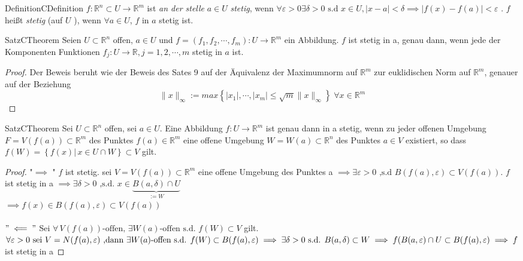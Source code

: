 \documentclass[11.5 pt, a4paper]{memoir}
\begin{document}
\begin{ibox}[]{Definition}{CDefinition}
    $ f: \mathbb{R}^n  \subset U \to \mathbb{R}^m $ ist \textit{an der stelle} $ a \in  U $ \textit{stetig}, wenn $ \forall \varepsilon 
	>0 \exists \delta >0 \text{ s.d } x \in  U, \left| x-a \right| < \delta \implies \left| f(x)-f(a) \right| < \varepsilon $ . $ f $ heißt
	\textit{stetig} (auf $ U $ ), wenn $ \forall  a \in U $, $ f \text{ in } a $ stetig ist. 
\end{ibox}

\begin{ibox}[14]{Satz}{CTheorem}
    Seien $ U \subset \mathbb{R}^n  $ offen, $ a \in  U $ und $ f=(f_1,f_2,\cdots, f_m): U \to \mathbb{R}^m  $ ein Abbildung. $ f $ ist 
	stetig in a, genau dann, wenn jede der Komponenten Funktionen $ f_{j} :U \to \mathbb{R} , j = 1,2, \cdots, m $ stetig in $ a $ ist.
\end{ibox}

\begin{proof}
	Der Beweis beruht wie der Beweis des Sates 9 auf der Äquivalenz der Maximumnorm auf $ \mathbb{R}^m $ zur euklidischen Norm auf 
	$ \mathbb{R}^m $, genauer auf der Beziehung
	$$ \|x \|_{\infty}:= max \left\{ \left| x_1 \right| ,\cdots, \left| x_m \right| \leq \sqrt{m} \|x \|_{\infty} \right\} \;  
	\forall  x \in  \mathbb{R}^m$$
	
\end{proof}
\begin{ibox}[15]{Satz}{CTheorem}
    Sei $ U \subset  \mathbb{R}^n  $ offen, sei $ a \in  U $. Eine Abbildung $ f: U \to \mathbb{R}^m $ ist genau dann in a stetig,
	wenn zu jeder offenen Umgebung $ F=V(f(a)) \subset \mathbb{R}^m $ des Punktes $ f(a) \in \mathbb{R}^m $ eine offene Umgebung
	$ W = W(a) \subset  \mathbb{R}^n  $ des Punktes $ a \in  V$ existiert, so dass $ f(W) = \left\{ f(x) |\, x \in U \cap W \right\} 
	\subset  V$ gilt. 
\end{ibox}

\begin{proof}
	"$  \implies$ " $ f $ ist stetig. sei $ V = V \left( f \left( a \right)  \right)  \subset  \mathbb{R}^m $ 
	eine offene Umgebung des Punktes a  $ \implies \exists 
	\varepsilon  >0 \text{ ,s.d } B(f(a), \varepsilon ) \subset  V(f(a))$. $ f $ ist stetig in a $ \implies \exists \delta > 0 
	\text{ ,s.d. } x \in  \underbrace{B(a, \delta) \cap U}_{:=W} $ \\ $\implies f(x) \in B(f(a), \varepsilon ) \subset  V(f(a))$\\ \\
	$ "\impliedby" $ Sei $ \forall \, V(f(a)) \text{-offen, } \exists W(a) \text{-offen s.d. } f(W) \subset  V $ gilt.
	$ \forall \varepsilon >0 \text{ sei } V = N(f(a), \varepsilon ) \\
	\text{ ,dann } \exists W(a) \text{-offen s.d. } f(W) \subset B(f(a), \varepsilon ) \implies 
	\exists  \delta >0 \text{ s.d. } B(a,\delta) \subset  W \\ 
	\implies  f(B(a, \varepsilon ) \cap U \subset B(f(a), \varepsilon ) \implies 
	f$ ist stetig in a   
\end{proof}
\end{document}
